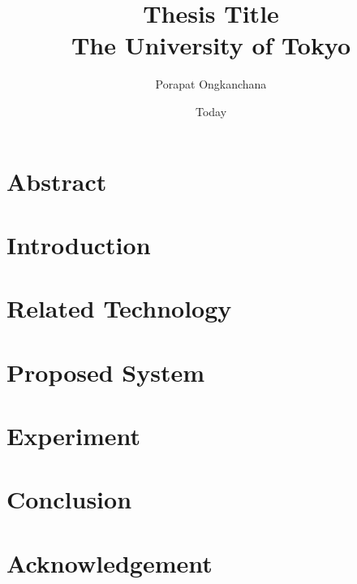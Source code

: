 \documentclass[12pt]{report}
\title{
    {Thesis Title} \\ 
    {\large The University of Tokyo}\\
}
\author{Porapat Ongkanchana}
\date{Today}
\begin{document}



\chapter*{Abstract} 
 

\tableofcontents
\listoffigures
 
\chapter{Introduction} 
\setcounter{page}{1}


\chapter{Related Technology} 


\chapter{Proposed System}


\chapter{Experiment}


\chapter{Conclusion}


\chapter*{Acknowledgement}


\printbibliography[title=References]
\end{document}
